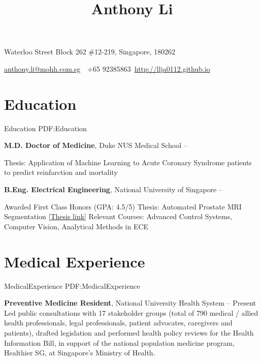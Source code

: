 \documentclass[letterpaper,10pt,oneside]{article}
\newcommand{\CVAuthor}{Anthony Li}
\newcommand{\CVWebpage}{http://llja0112.github.io}
\begin{document}

\title{\CVAuthor}

\begin{subtitle}
{Waterloo Street Block 262 \#12-219, Singapore, 180262}
\par
\href{mailto:anthony.li@mohh.com.sg}
{anthony.li@mohh.com.sg}
\,\SubBulletSymbol\,
+65 92385863\,
\href{\CVWebpage}
{\CVWebpage}
\end{subtitle}

\begin{body}


\section
{Education}
{Education}
{PDF:Education}

{\textbf{M.D. Doctor of Medicine}, Duke NUS Medical School}
\hfill
{} -- 

\GapNoBreak
\BulletItem
Thesis: Application of Machine Learning to Acute Coronary Syndrome patients to predict 
\newline reinfarction and mortality

\BigGap
{\textbf{B.Eng. Electrical Engineering}, National University of Singapore}
\hfill
{} --

\GapNoBreak
\BulletItem
Awarded First Class Honors (GPA: 4.5/5)
\BulletItem
Thesis: Automated Prostate MRI Segmentation [\href{https://drive.google.com/open?id=0B1GfPKwMcZtpdWp0aUpxMnlKbU1oLVJFbjN3bGwwcXZlVVNJ}{Thesis link}]
\BulletItem
Relevant Courses: Advanced Control Systems, Computer Vision, Analytical Methods in ECE

\section
{Medical Experience}
{MedicalExperience}
{PDF:MedicalExperience}

{\textbf{Preventive Medicine Resident}, National University Health System}
\hfill
{} --
Present
\BulletItem
Led public consultations with 17 stakeholder groups (total of 790 medical / allied health professionals, legal professionals, patient advocates, caregivers and patients), drafted legislation and performed health policy reviews for the Health Information Bill, in support of the national population medicine program, Healthier SG, at Singapore's Ministry of Health.


\end{body}
\end{document}

